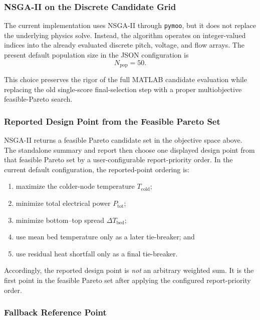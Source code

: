 \documentclass{article}
\begin{document}
\subsubsection{NSGA-II on the Discrete Candidate Grid}

The current implementation uses NSGA-II through \texttt{pymoo}, but it does
not replace the underlying physics solve. Instead, the algorithm operates on
integer-valued indices into the already evaluated discrete pitch, voltage, and
flow arrays. The present default population size in the JSON configuration is
\begin{equation}
N_{\mathrm{pop}} = 50.
\end{equation}

This choice preserves the rigor of the full MATLAB candidate evaluation while
replacing the old single-score final-selection step with a proper
multiobjective feasible-Pareto search.

\subsubsection{Reported Design Point from the Feasible Pareto Set}

NSGA-II returns a feasible Pareto candidate set in the objective space above.
The standalone summary and report then choose one displayed design point from
that feasible Pareto set by a user-configurable report-priority order. In the
current default configuration, the reported-point ordering is:
\begin{enumerate}
\item maximize the colder-node temperature $T_{\mathrm{cold}}$;
\item minimize total electrical power $P_{\mathrm{tot}}$;
\item minimize bottom--top spread $\Delta T_{\mathrm{bed}}$;
\item use mean bed temperature only as a later tie-breaker; and
\item use residual heat shortfall only as a final tie-breaker.
\end{enumerate}

Accordingly, the reported design point is \emph{not} an arbitrary weighted
sum. It is the first point in the feasible Pareto set after applying the
configured report-priority order.

\subsubsection{Fallback Reference Point}
\end{document}

